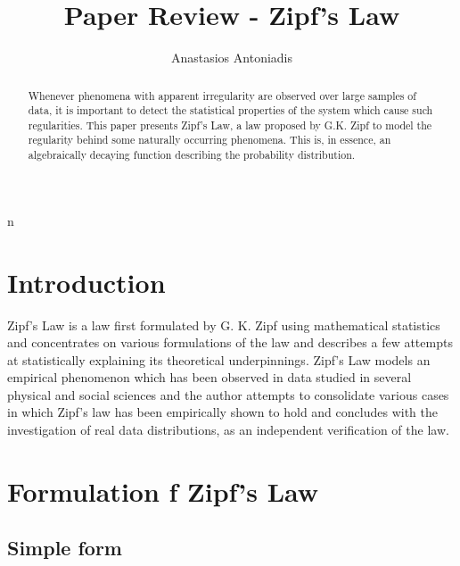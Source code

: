 \documentclass{article}
\begin{document}
\title{Paper Review - Zipf's Law}
\author{Anastasios Antoniadis}

\maketitle



\begin{abstract}

Whenever phenomena with apparent irregularity are observed over large
samples of data, it is important to detect the statistical properties
of the system which cause such regularities. This paper presents
Zipf's Law, a law proposed by G.K. Zipf to model the regularity behind 
some naturally occurring phenomena. This is, in essence, an
algebraically decaying function describing the probability distribution.
\end{abstract}

n%

\section{Introduction}

Zipf's Law is a law first formulated by G. K. Zipf using mathematical
statistics and concentrates on various formulations of the law and
describes a few attempts at statistically explaining its theoretical
underpinnings. Zipf's Law models an empirical phenomenon which has been 
observed in data studied in several physical and social sciences and
the author attempts to consolidate various cases in which Zipf's law
has been empirically shown to hold and concludes with the
investigation of real data distributions, as an independent
verification of the law.

\section{Formulation f Zipf's Law}
\subsection{Simple form}
\end{document}

